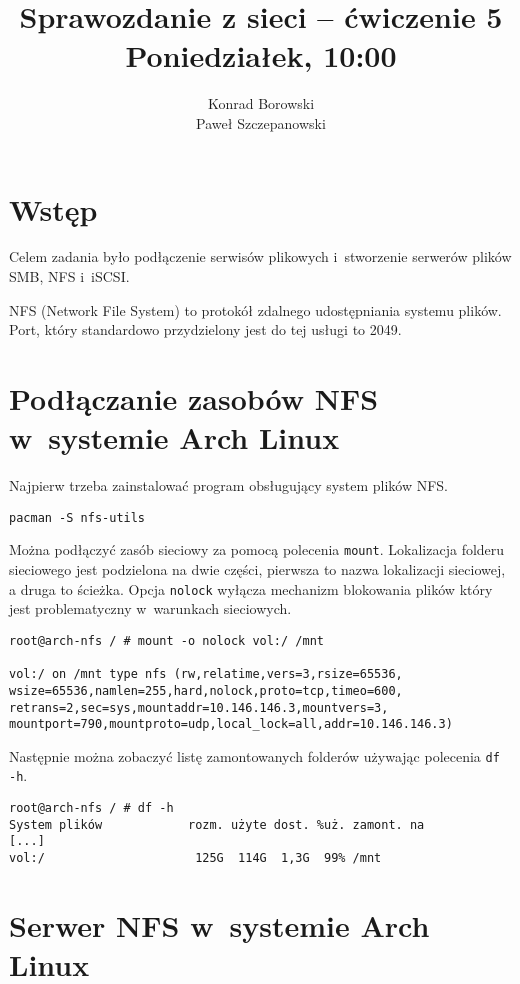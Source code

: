 \documentclass[a4paper,11pt]{article}
\title{Sprawozdanie z sieci -- ćwiczenie 5\\Poniedziałek, 10:00}
\author{Konrad Borowski\\Paweł Szczepanowski}
\begin{document}
\thispagestyle{empty}                   %

\maketitle
\tableofcontent
\section{Wstęp}

Celem zadania było podłączenie serwisów plikowych i~stworzenie serwerów
plików SMB, NFS i~iSCSI.

NFS (Network File System) to protokół zdalnego udostępniania systemu plików. Port, który standardowo przydzielony jest do tej usługi to 2049.
\section{Podłączanie zasobów NFS w~systemie Arch Linux}

Najpierw trzeba zainstalować program obsługujący system plików NFS.

\begin{verbatim}
pacman -S nfs-utils
\end{verbatim}

Można podłączyć zasób sieciowy za pomocą polecenia \verb|mount|.
Lokalizacja folderu sieciowego jest podzielona na dwie części,
pierwsza to nazwa lokalizacji sieciowej, a druga to ścieżka.
Opcja \verb|nolock| wyłącza mechanizm blokowania plików który jest
problematyczny w~warunkach sieciowych.

\begin{verbatim}
root@arch-nfs / # mount -o nolock vol:/ /mnt

vol:/ on /mnt type nfs (rw,relatime,vers=3,rsize=65536,
wsize=65536,namlen=255,hard,nolock,proto=tcp,timeo=600,
retrans=2,sec=sys,mountaddr=10.146.146.3,mountvers=3,
mountport=790,mountproto=udp,local_lock=all,addr=10.146.146.3)
\end{verbatim}

Następnie można zobaczyć listę zamontowanych folderów
używając polecenia \verb|df -h|.

\begin{verbatim}
root@arch-nfs / # df -h
System plików            rozm. użyte dost. %uż. zamont. na
[...]
vol:/                     125G  114G  1,3G  99% /mnt
\end{verbatim}

\section{Serwer NFS w~systemie Arch Linux}
\end{document}
